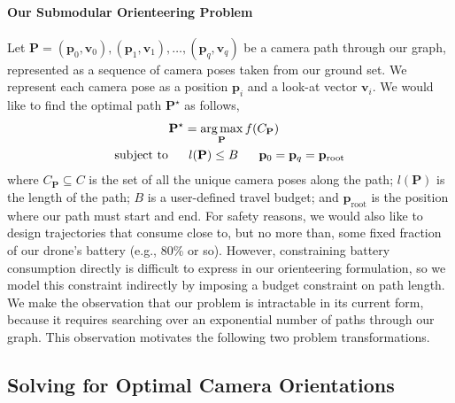 \paragraph{Our Submodular Orienteering Problem}
Let $\mathbf{P} = (\mathbf{p}_0, \mathbf{v}_0), (\mathbf{p}_1, \mathbf{v}_1), \ldots, (\mathbf{p}_q, \mathbf{v}_q)$ be a camera path through our graph, represented as a sequence of camera poses taken from our ground set.
We represent each camera pose as a position $\mathbf{p}_i$ and a look-at vector $\mathbf{v}_i$.
We would like to find the optimal path $\mathbf{P}^{\star}$ as follows,
%
\begin{equation}
\begin{aligned}
\mathbf{P}^{\star} = \operatorname*{arg\,max}_{\mathbf{P}} f(C_{\mathbf{P}})~~~~~~~~~~~~~~~~\\
\text{subject to} ~~~~~ l(\mathbf{P}) \leq B ~~~~~ \mathbf{p}_0 = \mathbf{p}_q = \mathbf{p}_\text{root}
\end{aligned}
\label{eqn:submodular_orienteering}
\end{equation}
%
where
$C_\mathbf{P} \subseteq C$ is the set of all the unique camera poses along the path; 
$l(\mathbf{P})$ is the length of the path; $B$ is a user-defined travel budget; and $\mathbf{p}_\text{root}$ is the position where our path must start and end.
For safety reasons, we would also like to design trajectories that consume close to, but no more than, some fixed fraction of our drone's battery (e.g., 80\% or so). However, constraining battery consumption directly is difficult to express in our orienteering formulation, so we model this constraint indirectly by imposing a budget constraint on path length.
We make the observation that our problem is intractable in its current form, because it requires searching over an exponential number of paths through our graph. This observation motivates the following two problem transformations.

\subsection{Solving for Optimal Camera Orientations} 
\label{sec:trajectories_orientation}


